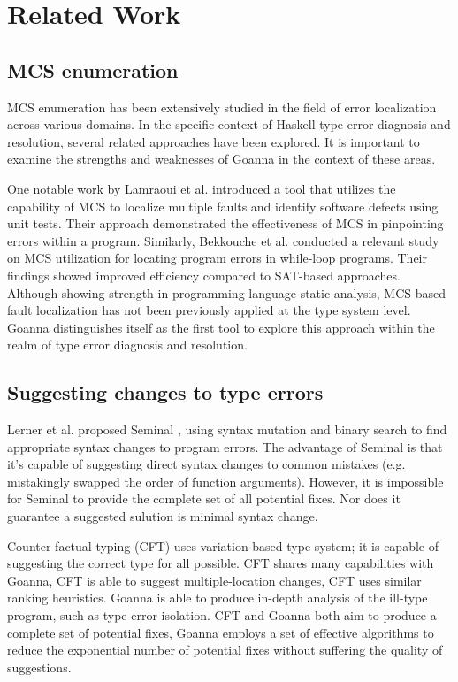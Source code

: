     \section{Related Work} \label{sec:related-work}
	\subsection{MCS enumeration}
	
    MCS enumeration has been extensively studied in the field of error localization across various domains. In the specific context of Haskell type error diagnosis and resolution, several related approaches have been explored. It is important to examine the strengths and weaknesses of Goanna in the context of these areas.

    One notable work by Lamraoui et al. introduced a tool \cite{Lamraoui2016-wr} that utilizes the capability of MCS to localize multiple faults and identify software defects using unit tests. Their approach demonstrated the effectiveness of MCS in pinpointing errors within a program. Similarly, Bekkouche et al. conducted a relevant study  \cite{Bekkouche2015-is}  on MCS utilization for locating program errors in while-loop programs. Their findings showed improved efficiency compared to SAT-based approaches. Although showing strength in programming language static analysis, MCS-based fault localization has not been previously applied at the type system level. Goanna distinguishes itself as the first tool to explore this approach within the realm of type error diagnosis and resolution.

    \subsection{Suggesting changes to type errors}
  Lerner et al. proposed Seminal \cite{Lerner2007-mu}, using syntax mutation and binary search to find appropriate syntax changes to program errors. The advantage of Seminal is that it's capable of suggesting direct syntax changes to common mistakes (e.g. mistakingly swapped the order of function arguments). However, it is impossible for Seminal to provide the complete set of all potential fixes. Nor does it guarantee a suggested sulution is minimal syntax change.
   
   Counter-factual typing (CFT) \cite{Chen2014-dz,Chen2020-ad} uses variation-based type system; it is capable of suggesting the correct type for all possible. CFT shares many capabilities with Goanna, CFT is able to suggest multiple-location changes, CFT uses similar ranking heuristics. Goanna is able to produce in-depth analysis of the ill-type program, such as type error isolation. CFT and Goanna both aim to produce a complete set of potential fixes, Goanna employs a set of effective algorithms to reduce the exponential number of potential fixes without suffering the quality of suggestions. 
   
